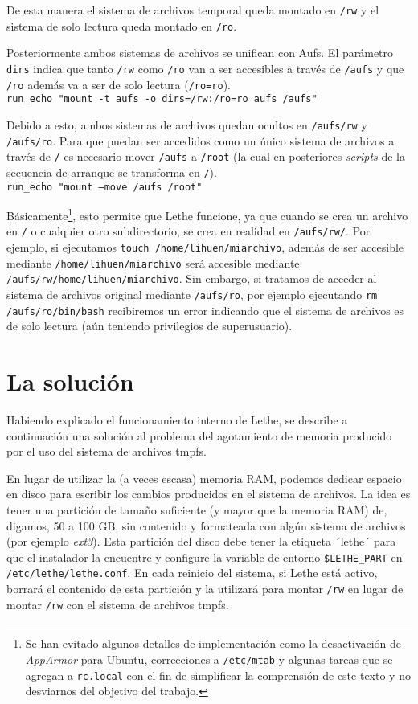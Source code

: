 \documentclass[final,narroweqnarray,inline,twoside]{ieee}
\begin{document}
De esta manera el sistema de archivos temporal queda montado en \texttt{/rw} y el sistema de solo lectura queda montado en
\texttt{/ro}.

Posteriormente ambos sistemas de archivos se unifican con Aufs. El parámetro \texttt{dirs} indica que tanto \texttt{/rw} como
\texttt{/ro} van a ser accesibles a través de \texttt{/aufs} y que \texttt{/ro} además va a ser de solo lectura
(\texttt{/ro=ro}). 
\\\indent\texttt{run\_echo "mount -t aufs -o dirs=/rw:/ro=ro aufs /aufs"}

Debido a esto, ambos sistemas de archivos quedan ocultos en \texttt{/aufs/rw} y \texttt{/aufs/ro}. Para que puedan ser
accedidos como un único sistema de archivos a través de \texttt{/} es necesario mover \texttt{/aufs} a \texttt{/root} (la
cual en posteriores \textit{scripts} de la secuencia de arranque se transforma en \texttt{/}).
\\\indent\texttt{run\_echo "mount --move /aufs /root"}

Básicamente\footnote{Se han evitado algunos detalles de implementación como la desactivación de \textit{AppArmor}
para Ubuntu, correcciones a \texttt{/etc/mtab} y algunas tareas que se agregan a \texttt{rc.local} con el fin de simplificar
la comprensión de este texto y no desviarnos del objetivo del trabajo.}, esto permite que Lethe funcione, ya que cuando se
crea un archivo en \texttt{/} o cualquier otro subdirectorio, se crea en realidad en \texttt{/aufs/rw/}. Por ejemplo, si
ejecutamos \texttt{touch /home/lihuen/miarchivo}, además de ser accesible mediante \texttt{/home/lihuen/miarchivo} será
accesible mediante \texttt{/aufs/rw/home/lihuen/miarchivo}. Sin embargo, si tratamos de acceder al sistema de archivos
original mediante \texttt{/aufs/ro}, por ejemplo ejecutando \texttt{rm /aufs/ro/bin/bash} recibiremos un error indicando que
el sistema de archivos es de solo lectura (aún teniendo privilegios de superusuario).

\section{La solución}
Habiendo explicado el funcionamiento interno de Lethe, se describe a continuación una solución al problema del agotamiento
de memoria producido por el uso del sistema de archivos tmpfs.

En lugar de utilizar la (a veces escasa) memoria RAM, podemos dedicar espacio en disco para escribir los cambios producidos
en el sistema de archivos. La idea es tener una partición de tamaño suficiente (y mayor que la memoria RAM) de, digamos, 50 a
100 GB, sin contenido y formateada con algún sistema de archivos (por ejemplo \textit{ext3}). Esta partición del disco debe
tener la etiqueta ´lethe´ para que el instalador la encuentre y configure la variable de entorno \texttt{\$LETHE\_PART} en
\texttt{/etc/lethe/lethe.conf}. En cada reinicio del sistema, si Lethe está activo, borrará el contenido de esta partición y
la utilizará para montar \texttt{/rw} en lugar de montar \texttt{/rw} con el sistema de archivos tmpfs.
\end{document}
